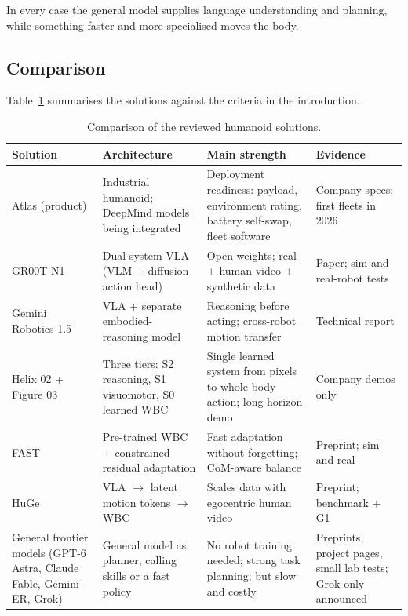 \documentclass[11pt,a4paper]{article}
\begin{document}
In every case the general model supplies language understanding and planning,
while something faster and more specialised moves the body.

\subsection{Comparison}

Table~\ref{tab:compare} summarises the solutions against the criteria in the
introduction.


\begin{table}[H]
\centering\small
\renewcommand{\arraystretch}{1.25}
\begin{tabularx}{\textwidth}{>{\raggedright\arraybackslash}p{2.3cm}
  >{\raggedright\arraybackslash}X >{\raggedright\arraybackslash}X
  >{\raggedright\arraybackslash}p{2.6cm}}
\toprule
Solution & Architecture & Main strength & Evidence \\
\midrule
Atlas (product) & Industrial humanoid; DeepMind models being integrated &
Deployment readiness: payload, environment rating, battery self-swap, fleet
software & Company specs; first fleets in 2026 \\
GR00T N1 & Dual-system VLA (VLM + diffusion action head) & Open weights;
real + human-video + synthetic data & Paper; sim and real-robot tests \\
Gemini Robotics 1.5 & VLA + separate embodied-reasoning model & Reasoning
before acting; cross-robot motion transfer & Technical report \\
Helix 02 + Figure 03 & Three tiers: S2 reasoning, S1 visuomotor, S0 learned
WBC & Single learned system from pixels to whole-body action; long-horizon
demo & Company demos only \\
FAST & Pre-trained WBC + constrained residual adaptation & Fast adaptation
without forgetting; CoM-aware balance & Preprint; sim and real \\
HuGe & VLA $\rightarrow$ latent motion tokens $\rightarrow$ WBC & Scales data
with egocentric human video & Preprint; benchmark + G1 \\
General frontier models (GPT-6 Astra, Claude Fable, Gemini-ER, Grok) &
General model as planner, calling skills or a fast policy & No robot
training needed; strong task planning; but slow and costly & Preprints,
project pages, small lab tests; Grok only announced \\
\bottomrule
\end{tabularx}
\caption{Comparison of the reviewed humanoid solutions.}
\label{tab:compare}
\end{table}
\end{document}
